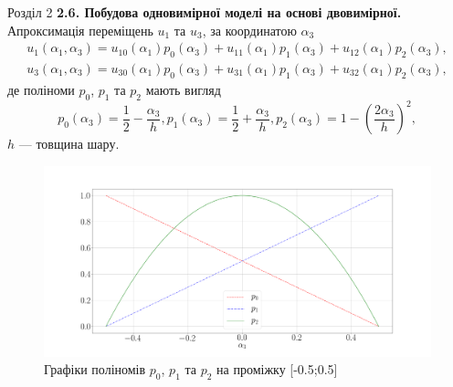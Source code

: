 \documentclass[8pt]{beamer}
\numberwithin{figure}{section}
\numberwithin{equation}{section}
\begin{document}
\begin{frame}{Розділ 2}
\textbf{2.6. Побудова одновимірної моделі на основі двовимірної.}
\linebreak
\linebreak
Апроксимація переміщень $u_1$ та $u_3$, за координатою $\alpha_3$ 
\begin{align}
u_1 \left( \alpha_1, \alpha_3 \right) = u_{10} \left( \alpha_1\right)p_0 \left( \alpha_3\right)+u_{11} \left( \alpha_1\right)p_1 \left( \alpha_3\right)+u_{12} \left( \alpha_1\right)p_2 \left( \alpha_3\right),\\
u_3 \left( \alpha_1, \alpha_3 \right) = u_{30} \left( \alpha_1\right)p_0 \left( \alpha_3\right)+u_{31} \left( \alpha_1\right)p_1 \left( \alpha_3\right)+u_{32} \left( \alpha_1\right)p_2 \left( \alpha_3\right),
\end{align}
де поліноми $p_0$, $p_1$ та $p_2$ мають вигляд
\begin{equation}
p_0 \left( \alpha_3\right) = \frac12-\frac{\alpha_3}{h},
p_1 \left( \alpha_3\right) = \frac12+\frac{\alpha_3}{h},
p_2 \left( \alpha_3\right) = 1-\left(\frac{2\alpha_3}{h}\right)^2,
\end{equation}
$h$ --- товщина шару.
\begin{figure}
\includegraphics[scale=0.1]{pic/polin.png}
\caption{Графіки поліномів $p_0$, $p_1$ та $p_2$ на проміжку [-0.5;0.5]}
\end{figure}

\end{frame}
\end{document}
